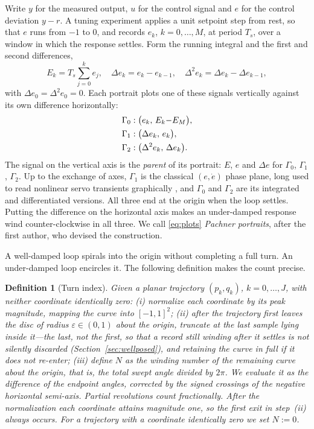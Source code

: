\documentclass[final,3p,times,twocolumn]{elsarticle}
\newcommand{\rev}[1]{#1}   %
\newcommand{\fix}[1]{#1}  %
\newtheorem{definition}{Definition}
\begin{document}
Write $y$ for the measured output, $u$ for the control signal and $e$
for the control deviation $y-r$. A tuning experiment applies a unit
setpoint step from rest, so that $e$ runs from $-1$ to $0$, and records
$e_k$, $k = 0,\dots,M$, at period $T_s$, over a window in which the
response settles. Form the running integral and the first
and second differences,
\begin{equation}
E_k = T_s\!\sum_{j=0}^{k} e_j, \quad
\Delta e_k = e_k - e_{k-1}, \quad
\Delta^2 e_k = \Delta e_k - \Delta e_{k-1},
\end{equation}
with $\Delta e_0 = \Delta^2 e_0 = 0$. Each portrait plots one of these
signals vertically against its own difference horizontally:
\begin{align}
\Gamma_0&: \bigl(e_k,\, E_k{-}E_{M}\bigr), \notag\\
\Gamma_1&: \bigl(\Delta e_k,\, e_k\bigr), \notag\\
\Gamma_2&: \bigl(\Delta^2 e_k,\, \Delta e_k\bigr).
\label{eq:plots}
\end{align}
The signal on the vertical axis is the \emph{parent} of its portrait:
$E$, $e$ and $\Delta e$ for $\Gamma_0$, $\Gamma_1$, $\Gamma_2$. Up to the exchange of axes, $\Gamma_1$ is the
classical $(e,\dot e)$ phase plane, long used to read nonlinear servo
transients graphically \cite{GrahamMcRuer1961}, and $\Gamma_0$ and
$\Gamma_2$ are its integrated and differentiated versions. All three end
at the origin when the loop settles. Putting the difference on the
horizontal axis makes an under-damped response wind counter-clockwise in
all three. We call
\eqref{eq:plots} \emph{Pachner portraits}, after the first author, who
devised the construction.

A well-damped loop spirals into the origin without completing a full
turn. An under-damped loop encircles it. The following definition makes
the count precise.

\begin{definition}[Turn index]\label{def:index}
Given a planar trajectory $(p_k, q_k)$, $k = 0,\dots,J$, with neither
coordinate identically zero:
(i) normalize each coordinate by its peak magnitude, mapping the curve
into $[-1,1]^2$;
(ii) after the trajectory first leaves the disc of radius
$\varepsilon \in (0,1)$ about the origin, truncate at the last sample
lying inside it---the last, not the first, so that a record
still winding after it settles is not silently discarded
(Section~\ref{sec:wellposed})\fix{, and retaining the curve in full if it
does not re-enter};
(iii) define $N$ as the winding number of the remaining curve about the
origin, that is, the total swept angle divided by $2\pi$. We evaluate it
as the difference of the endpoint angles, corrected by the signed
crossings of the negative horizontal semi-axis. Partial revolutions
count fractionally.
\rev{After the normalization each coordinate attains magnitude one, so
the first exit in step~(ii) always occurs. For a trajectory with a
coordinate identically zero we set $N := 0$.}
\end{definition}
\end{document}
